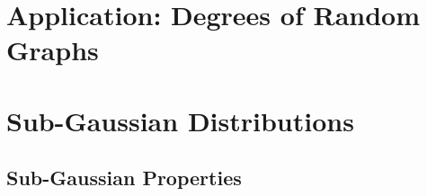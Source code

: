 \documentclass{report}
\theoremstyle{definition}
\newenvironment{exercise}[1]{
  \renewcommand\theexerciseimpl{#1}
  \exerciseimpl
}{\endexerciseimpl}
\begin{document}
\begin{exercise}{2.3.2}
\end{exercise}

\begin{exercise}{2.3.3}
\end{exercise}

\begin{exercise}{2.3.5}
\end{exercise}

\begin{exercise}{2.3.6}
\end{exercise}

\begin{exercise}{2.3.8}
\end{exercise}

\section{Application: Degrees of Random Graphs}

\begin{exercise}{2.4.2}
\end{exercise}

\begin{exercise}{2.4.3}
\end{exercise}

\begin{exercise}{2.4.4}
\end{exercise}

\begin{exercise}{2.4.5}
\end{exercise}

\section{Sub-Gaussian Distributions}

\subsection{Sub-Gaussian Properties}

\begin{exercise}{2.5.1}
\end{exercise}

\begin{exercise}{2.5.4}
\end{exercise}

\begin{exercise}{2.5.5}
\end{exercise}
\end{document}
